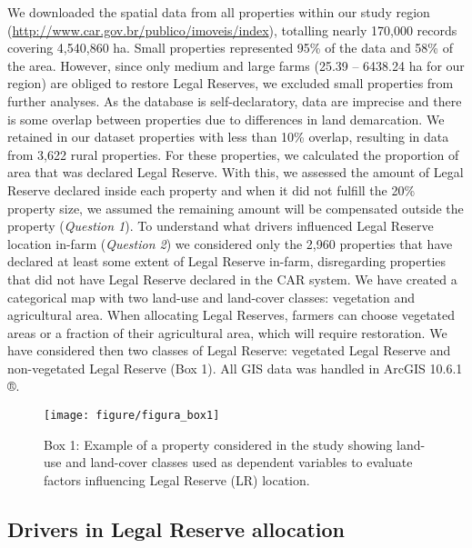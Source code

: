 \documentclass[
	12pt,				%
	oneside,			%
	a4paper,			%
	chapter=TITLE,		%
	section=TITLE,		%
	brazil,			%
	english				%
	]{abntex2}
\begin{document}
We downloaded the spatial data from all properties within our study region (\url{http://www.car.gov.br/publico/imoveis/index}), totalling nearly 170,000 records covering 4,540,860 ha. Small properties represented 95\% of the data and 58\% of the area. However, since only medium and large farms (25.39 -- 6438.24 ha for our region) are obliged to restore Legal Reserves, we excluded small properties from further analyses. As the database is self-declaratory, data are imprecise and there is some overlap between properties due to differences in land demarcation. We retained in our dataset properties with less than 10\% overlap, resulting in data from 3,622 rural properties. For these properties, we calculated the proportion of area that was declared Legal Reserve. With this, we assessed the amount of Legal Reserve declared inside each property and when it did not fulfill the 20\% property size, we assumed the remaining amount will be compensated outside the property (\emph{Question 1}). To understand what drivers influenced Legal Reserve location in-farm (\emph{Question 2}) we considered only the 2,960 properties that have declared at least some extent of Legal Reserve in-farm, disregarding properties that did not have Legal Reserve declared in the CAR system. We have created a categorical map with two land-use and land-cover classes: vegetation and agricultural area. When allocating Legal Reserves, farmers can choose vegetated areas or a fraction of their agricultural area, which will require restoration. We have considered then two classes of Legal Reserve: vegetated Legal Reserve and non-vegetated Legal Reserve (Box 1). All GIS data was handled in ArcGIS 10.6.1 ®.
\begin{figure}[H]

{\centering \texttt{[image: figure/figura\_box1]} 

}

\caption{Box 1: Example of a property considered in the study showing land-use and land-cover classes used as dependent variables  to evaluate  factors influencing  Legal Reserve (LR) location.}\label{fig:unnamed-chunk-2}
\end{figure}
\hypertarget{drivers-in-legal-reserve-allocation}{%
\subsection{Drivers in Legal Reserve allocation}\label{drivers-in-legal-reserve-allocation}}
\end{document}
